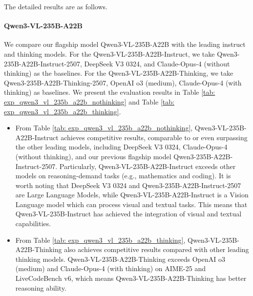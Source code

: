 The detailed results are as follows.


\paragraph{Qwen3-VL-235B-A22B}
We compare our flagship model Qwen3-VL-235B-A22B with the leading instruct and thinking models. For the Qwen3-VL-235B-A22B-Instruct, we take Qwen3-235B-A22B-Instruct-2507, DeepSeek V3 0324, and Claude-Opus-4 (without thinking) as the baselines. For the Qwen3-VL-235B-A22B-Thinking, we take Qwen3-235B-A22B-Thinking-2507, OpenAI o3 (medium), Claude-Opus-4 (with thinking) as baselines. We present the evaluation results in Table \ref{tab: exp_qwen3_vl_235b_a22b_nothinking} and Table \ref{tab: exp_qwen3_vl_235b_a22b_thinking}. 

\begin{itemize}[itemindent=0pt, labelsep=4pt, leftmargin=*]
    \item From Table \ref{tab: exp_qwen3_vl_235b_a22b_nothinking}, Qwen3-VL-235B-A22B-Instruct achieves competitive results, comparable to or even surpassing the other leading models, including DeepSeek V3 0324, Claude-Opus-4 (without thinking), and our previous flagship model Qwen3-235B-A22B-Instruct-2507. Particularly, Qwen3-VL-235B-A22B-Instruct exceeds other models on reasoning-demand tasks (e.g., mathematics and coding). It is worth noting that DeepSeek V3 0324 and Qwen3-235B-A22B-Instruct-2507 are Large Language Models, while Qwen3-VL-235B-A22B-Instruct is a Vision Language model which can process visual and textual tasks. This means that Qwen3-VL-235B-Instruct has achieved the integration of visual and textual capabilities.
    \item From Table \ref{tab: exp_qwen3_vl_235b_a22b_thinking}, Qwen3-VL-235B-A22B-Thinking also achieves competitive results compared with other leading thinking models. Qwen3-VL-235B-A22B-Thinking exceeds OpenAI o3 (medium) and Claude-Opus-4 (with thinking) on AIME-25 and LiveCodeBench v6, which means Qwen3-VL-235B-A22B-Thinking has better reasoning ability.
\end{itemize}


